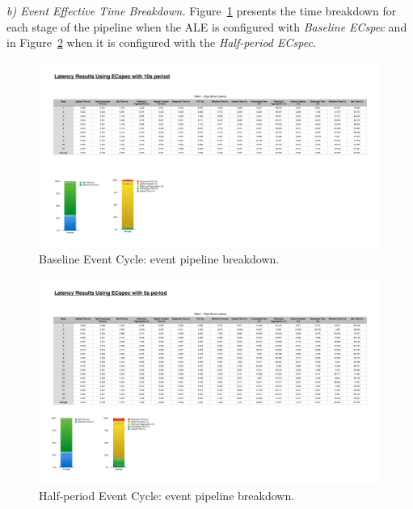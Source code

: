 \textit{b) Event Effective Time Breakdown.}
Figure~\ref{fig:ecspec_effective_base} presents the time breakdown for each stage of the pipeline
when the \gls{ALE} is configured with \textit{Baseline ECspec} and in Figure~\ref{fig:ecspec_effective_half}
when it is configured with the \textit{Half-period ECspec}.

\begin{figure}[ht!]
  \centering
  \includegraphics[height=.7\linewidth]{./figures/edge_ecspec_effective_breakdown}
  \caption{Baseline Event Cycle: event pipeline breakdown.}
  \label{fig:ecspec_effective_base}
\end{figure}

\begin{figure}[ht!]
  \centering
  \includegraphics[width=.7\linewidth]{./figures/edge_ecspecf_effective_breakdown}
  \caption{Half-period Event Cycle: event pipeline breakdown.}
  \label{fig:ecspec_effective_half}
\end{figure}

